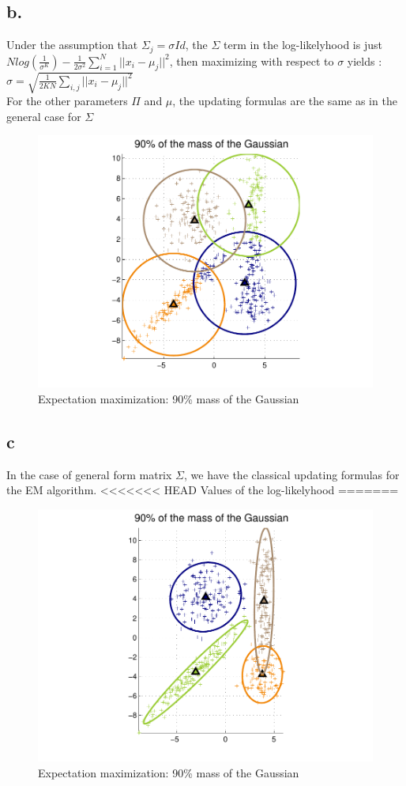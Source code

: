 \documentclass[12pt]{article}
\begin{document}
\subsection*{b.}
Under the assumption that $\Sigma_{j} = \sigma Id$, the $\Sigma$ term in the log-likelyhood is just ~\\
$N log(\frac{1}{\sigma^{K}})-\frac{1}{2\sigma^{2}} \sum \limits_{i=1}^N ||x_{i}-\mu_{j}||^{2}$, then maximizing with respect to $\sigma$ yields :~\\
$\sigma=\sqrt{\frac{1}{2KN}\sum \limits_{i,j} ||x_{i}-\mu_{j}||^2}$~\\
For the other parameters $\Pi$ and $\mu$, the updating formulas are the same as in the general case for $\Sigma$
\begin{figure}[h!]
	\centering 
	\includegraphics[width=.8\textwidth]{./pics/3b.pdf}
	\caption{Expectation maximization: 90\% mass of the Gaussian}
	\label{fig:3b}
\end{figure}

\subsection*{c}
In the case of general form matrix $\Sigma$, we have the classical updating formulas for the EM algorithm.
<<<<<<< HEAD
Values of the log-likelyhood
=======
\begin{figure}[h!]
	\centering 
	\includegraphics[width=.8\textwidth]{./pics/3c.pdf}
	\caption{Expectation maximization: 90\% mass of the Gaussian}
	\label{fig:3c}
\end{figure}
\end{document}
